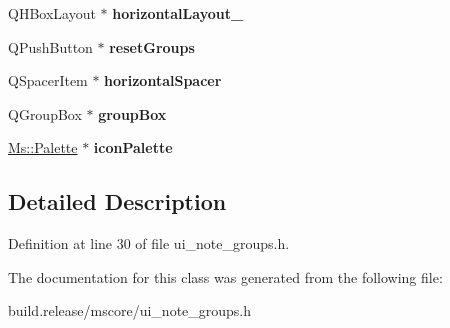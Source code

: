 \begin{DoxyCompactItemize}
Q\+H\+Box\+Layout $\ast$ {\bfseries horizontal\+Layout\+\_}
\item 
\mbox{\label{class_ui___note_groups_ad1d30c4342b627d7865d2c480f051ecd}} 
Q\+Push\+Button $\ast$ {\bfseries reset\+Groups}
\item 
\mbox{\label{class_ui___note_groups_a23aedbbf9333923858e4d9cf02ebb531}} 
Q\+Spacer\+Item $\ast$ {\bfseries horizontal\+Spacer}
\item 
\mbox{\label{class_ui___note_groups_a2c2e35cb664f7a59584e8bfef74147f5}} 
Q\+Group\+Box $\ast$ {\bfseries group\+Box}
\item 
\mbox{\label{class_ui___note_groups_ae87f96d597ee12726403be63ad400273}} 
\hyperlink{class_ms_1_1_palette}{Ms\+::\+Palette} $\ast$ {\bfseries icon\+Palette}
\end{DoxyCompactItemize}


\subsection{Detailed Description}


Definition at line 30 of file ui\+\_\+note\+\_\+groups.\+h.



The documentation for this class was generated from the following file\+:\begin{DoxyCompactItemize}
\item 
build.\+release/mscore/ui\+\_\+note\+\_\+groups.\+h\end{DoxyCompactItemize}
